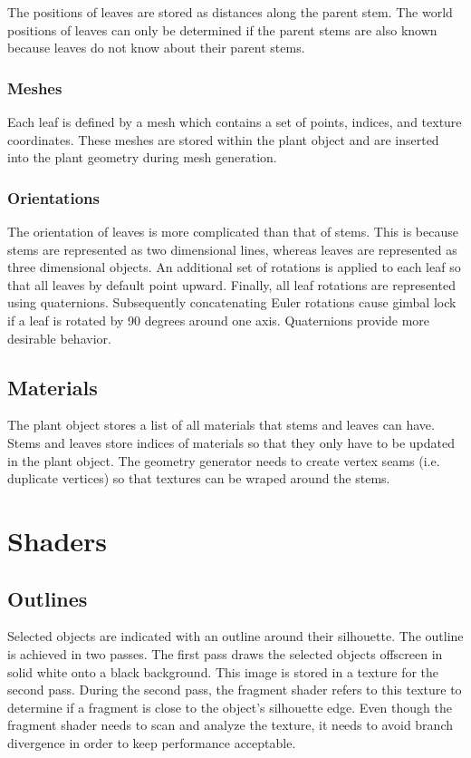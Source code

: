 \documentclass[10pt]{article}
\begin{document}
The positions of leaves are stored as distances along the parent stem. The world positions of leaves can only be determined if the parent stems are also known because leaves do not know about their parent stems.

\subsubsection{Meshes}

Each leaf is defined by a mesh which contains a set of points, indices, and texture coordinates. These meshes are stored within the plant object and are inserted into the plant geometry during mesh generation.

\subsubsection{Orientations}

The orientation of leaves is more complicated than that of stems. This is because stems are represented as two dimensional lines, whereas leaves are represented as three dimensional objects. An additional set of rotations is applied to each leaf so that all leaves by default point upward. Finally, all leaf rotations are represented using quaternions. Subsequently concatenating Euler rotations cause gimbal lock if a leaf is rotated by 90 degrees around one axis. Quaternions provide more desirable behavior.

\subsection{Materials}

The plant object stores a list of all materials that stems and leaves can have. Stems and leaves store indices of materials so that they only have to be updated in the plant object. The geometry generator needs to create vertex seams (i.e. duplicate vertices) so that textures can be wraped around the stems.

\section{Shaders}

\subsection{Outlines}

Selected objects are indicated with an outline around their silhouette. The outline is achieved in two passes. The first pass draws the selected objects offscreen in solid white onto a black background. This image is stored in a texture for the second pass. During the second pass, the fragment shader refers to this texture to determine if a fragment is close to the object's silhouette edge. Even though the fragment shader needs to scan and analyze the texture, it needs to avoid branch divergence in order to keep performance acceptable.
\end{document}
